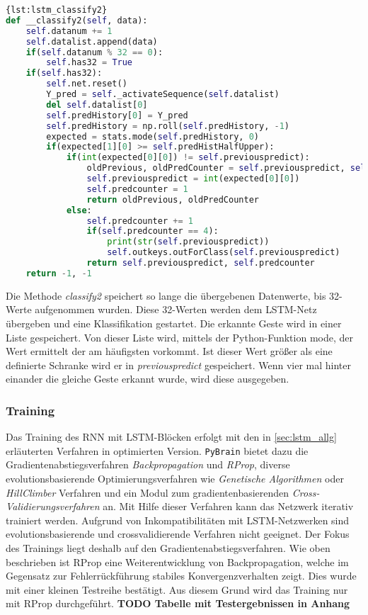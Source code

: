 \begin{lstlisting}[language=Python,caption={Classify
Variante 2},label={lst:lstm_classify2}]{lst:lstm_classify2}
def __classify2(self, data):
	self.datanum += 1
	self.datalist.append(data)
	if(self.datanum % 32 == 0):
		self.has32 = True
	if(self.has32):
		self.net.reset()
		Y_pred = self._activateSequence(self.datalist)
		del self.datalist[0]
		self.predHistory[0] = Y_pred
		self.predHistory = np.roll(self.predHistory, -1)
		expected = stats.mode(self.predHistory, 0)
		if(expected[1][0] >= self.predHistHalfUpper):
			if(int(expected[0][0]) != self.previouspredict):
				oldPrevious, oldPredCounter = self.previouspredict, self.previouspredict
				self.previouspredict = int(expected[0][0])
				self.predcounter = 1
				return oldPrevious, oldPredCounter
			else:
				self.predcounter += 1
				if(self.predcounter == 4):
					print(str(self.previouspredict))
					self.outkeys.outForClass(self.previouspredict)
				return self.previouspredict, self.predcounter
	return -1, -1
\end{lstlisting}

Die Methode \textit{classify2} speichert so lange die übergebenen Datenwerte, 
bis 32-Werte aufgenommen wurden. Diese 32-Werten werden dem \ac{LSTM}-Netz 
übergeben und eine Klassifikation gestartet. Die erkannte Geste wird in einer 
Liste gespeichert. Von dieser Liste wird, mittels der Python-Funktion mode, 
der Wert ermittelt der am häufigsten vorkommt. Ist dieser Wert größer als eine 
definierte Schranke wird er in \textit{previouspredict} gespeichert. Wenn vier 
mal hinter einander die gleiche Geste erkannt wurde, wird diese ausgegeben.

\subsubsection{Training}
Das Training des \ac{RNN} mit \ac{LSTM}-Blöcken erfolgt mit den in
\autoref{sec:lstm_allg} erläuterten Verfahren in optimierten Version.
\texttt{PyBrain} bietet dazu die Gradientenabstiegsverfahren
\textit{Backpropagation} und \textit{\ac{RProp}}, diverse evolutionsbasierende
Optimierungsverfahren wie \textit{Genetische Algorithmen} oder
\textit{HillClimber} Verfahren und ein Modul zum gradientenbasierenden
\textit{Cross-Validierungsverfahren} an. Mit Hilfe dieser Verfahren kann das
Netzwerk iterativ trainiert werden. Aufgrund von Inkompatibilitäten mit
\ac{LSTM}-Netzwerken sind evolutionsbasierende und crossvalidierende Verfahren
nicht geeignet. Der Fokus des Trainings liegt deshalb auf den
Gradientenabstiegsverfahren. Wie oben beschrieben ist \ac{RProp} eine
Weiterentwicklung von Backpropagation, welche im Gegensatz zur Fehlerrückführung
stabiles Konvergenzverhalten zeigt. Dies wurde mit einer kleinen Testreihe
bestätigt. Aus diesem Grund wird das Training nur mit \ac{RProp} durchgeführt.
\textbf{TODO Tabelle mit Testergebnissen in Anhang}

